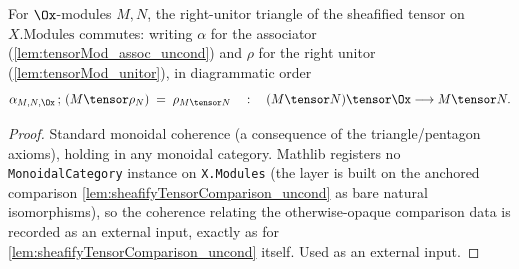 \begin{lemma}
  \label{lem:internal_tensorMod_rightUnitality}
  For $\Ox$-modules $M, N$, the right-unitor triangle of the sheafified tensor on
  $X.\mathrm{Modules}$ commutes: writing $\alpha$ for the associator
  (\cref{lem:tensorMod_assoc_uncond}) and $\rho$ for the right unitor
  (\cref{lem:tensorMod_unitor}), in diagrammatic order
  \[
    \alpha_{M,N,\Ox} \,;\, (M \tensor \rho_N) \;=\; \rho_{M \tensor N}
    \quad:\quad (M \tensor N) \tensor \Ox \longrightarrow M \tensor N.
  \]
  \begin{proof}
    Standard monoidal coherence (a consequence of the triangle/pentagon axioms), holding
    in any monoidal category. Mathlib registers no \texttt{MonoidalCategory} instance on
    \texttt{X.Modules} (the layer is built on the anchored comparison
    \cref{lem:sheafifyTensorComparison_uncond} as bare natural isomorphisms), so the
    coherence relating the otherwise-opaque comparison data is recorded as an external
    input, exactly as for \cref{lem:sheafifyTensorComparison_uncond} itself. Used as an
    external input.
  \end{proof}
\end{lemma}

